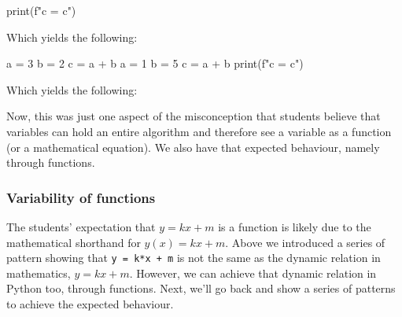 \begin{description}
\begin{minipage}[t]{0.45\columnwidth}
\begin{pyblock}[varstateG1]
print(f"c = {c}")
        \end{pyblock}

        \vspace{0.5em}
        Which yields the following:
        \printpythontex[verbatim]
      \end{minipage}
      \hfill
      \begin{minipage}[t]{0.45\columnwidth}
        \begin{pyblock}[varstateG1][highlightlines=6]
a = 3
b = 2
c = a + b
a = 1
b = 5
c = a + b
print(f"c = {c}")
        \end{pyblock}

        \vspace{0.5em}
        Which yields the following:
        \printpythontex[verbatim]
      \end{minipage}
\end{description}

Now, this was just one aspect of the misconception that students believe that 
variables can hold an entire algorithm and therefore see a variable as a 
function (or a mathematical equation).
We also have that expected behaviour, namely through functions.

\subsubsection{Variability of functions}

The students' expectation that \(y = kx + m\) is a function 
\parencite{Kohn2017VariableEvaluation,Plass2015Variables,Doukakis2007} is 
likely due to the mathematical shorthand for \(y(x) = kx + m\).
Above we introduced a series of pattern showing that
\texttt{y = k*x + m}
is not the same as the dynamic relation in mathematics,
\(y = kx + m\).
However, we can achieve that dynamic relation in Python too, through functions.
Next, we'll go back and show a series of patterns to achieve the expected 
behaviour.

